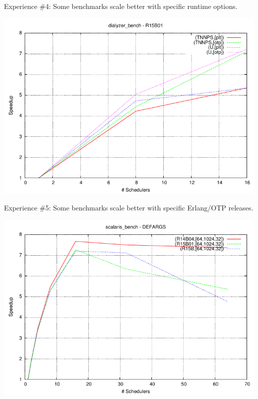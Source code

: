 \documentclass{beamer}
\begin{document}
\begin{frame}{Experience \#4: Some benchmarks scale better with specific runtime options.}
    \begin{center}
        \includegraphics[width=0.8\linewidth]{figures/dialyzer_bench-speedup-bulldozer.pdf}
    \end{center}
\end{frame}

\begin{frame}{Experience \#5: Some benchmarks scale better with specific Erlang/OTP releases.}
    \begin{center}
        \includegraphics[width=0.8\linewidth]{figures/scalaris-speedup-bulldozer.pdf}
    \end{center}
\end{frame}
\end{document}
